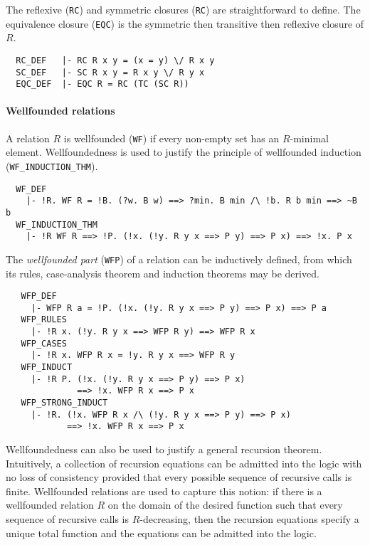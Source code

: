 \medskip

The reflexive ({\small\verb+RC+}) and symmetric closures
({\small\verb+RC+}) are straightforward to define. The equivalence
closure ({\small\verb+EQC+}) is the symmetric then transitive then
reflexive closure of $R$.
%
\begin{hol}
{\small
\begin{verbatim}
  RC_DEF   |- RC R x y = (x = y) \/ R x y
  SC_DEF   |- SC R x y = R x y \/ R y x
  EQC_DEF  |- EQC R = RC (TC (SC R))
\end{verbatim}
}
\end{hol}

\paragraph {Wellfounded relations}

A relation $R$ is wellfounded ({\small\verb+WF+}) if every non-empty set
has an $R$-minimal element. Wellfoundedness is used to justify the
principle of wellfounded induction ({\small\verb+WF_INDUCTION_THM+}).
%
\begin{hol}
{\small
\begin{verbatim}
  WF_DEF
    |- !R. WF R = !B. (?w. B w) ==> ?min. B min /\ !b. R b min ==> ~B b
  WF_INDUCTION_THM
    |- !R WF R ==> !P. (!x. (!y. R y x ==> P y) ==> P x) ==> !x. P x
\end{verbatim}
}
\end{hol}

The \emph{wellfounded part} ({\small\verb+WFP+}) of a relation can be
inductively defined, from which its rules, case-analysis theorem and
induction theorems may be derived.
%
\begin{hol}
{\small
\begin{verbatim}
   WFP_DEF
     |- WFP R a = !P. (!x. (!y. R y x ==> P y) ==> P x) ==> P a
   WFP_RULES
     |- !R x. (!y. R y x ==> WFP R y) ==> WFP R x
   WFP_CASES
     |- !R x. WFP R x = !y. R y x ==> WFP R y
   WFP_INDUCT
     |- !R P. (!x. (!y. R y x ==> P y) ==> P x)
              ==> !x. WFP R x ==> P x
   WFP_STRONG_INDUCT
     |- !R. (!x. WFP R x /\ (!y. R y x ==> P y) ==> P x)
            ==> !x. WFP R x ==> P x
\end{verbatim}
}
\end{hol}

Wellfoundedness can also be used to justify a general recursion
theorem. Intuitively, a collection of recursion equations can be
admitted into the \HOL{} logic with no loss of consistency provided
that every possible sequence of recursive calls is finite. Wellfounded
relations are used to capture this notion: if there is a wellfounded
relation $R$ on the domain of the desired function such that every
sequence of recursive calls is $R$-decreasing, then the recursion
equations specify a unique total function and the equations can be
admitted into the logic.

